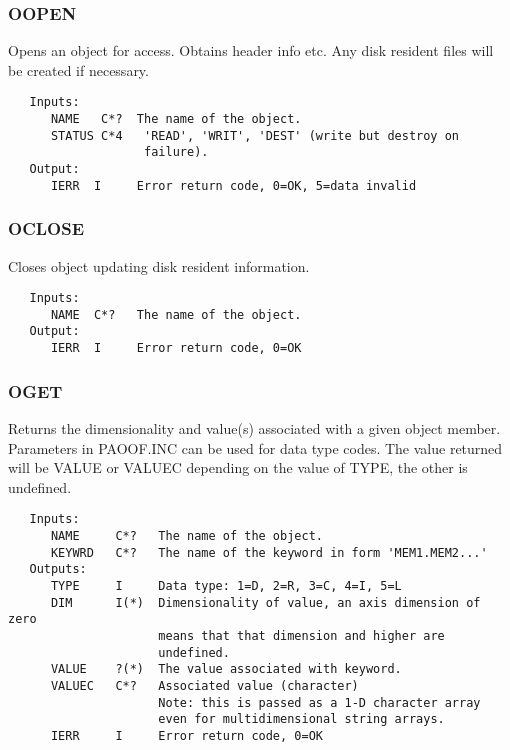 \subsubsection{OOPEN}
   Opens an object for access.  Obtains header info etc.  Any disk
resident files will be created if necessary.
{\small\begin{verbatim}
   Inputs:
      NAME   C*?  The name of the object.
      STATUS C*4   'READ', 'WRIT', 'DEST' (write but destroy on
                   failure).
   Output:
      IERR  I     Error return code, 0=OK, 5=data invalid
\end{verbatim}}
\subsubsection{OCLOSE}
   Closes object updating disk resident information.
{\small\begin{verbatim}
   Inputs:
      NAME  C*?   The name of the object.
   Output:
      IERR  I     Error return code, 0=OK
\end{verbatim}}
\subsubsection{OGET}
   Returns the dimensionality and value(s) associated with a given
object member.  Parameters in PAOOF.INC can be used for data type
codes.  The value returned will be VALUE or VALUEC depending on the
value of TYPE, the other is undefined.
{\small\begin{verbatim}
   Inputs:
      NAME     C*?   The name of the object.
      KEYWRD   C*?   The name of the keyword in form 'MEM1.MEM2...'
   Outputs:
      TYPE     I     Data type: 1=D, 2=R, 3=C, 4=I, 5=L
      DIM      I(*)  Dimensionality of value, an axis dimension of zero
                     means that that dimension and higher are
                     undefined.
      VALUE    ?(*)  The value associated with keyword.
      VALUEC   C*?   Associated value (character)
                     Note: this is passed as a 1-D character array
                     even for multidimensional string arrays.
      IERR     I     Error return code, 0=OK
\end{verbatim}}
